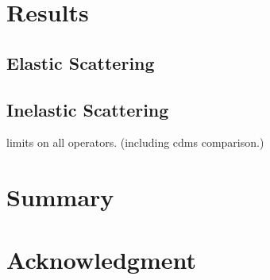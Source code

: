 \section{Results}
\subsection{Elastic Scattering}
\subsection{Inelastic Scattering}
limits on all operators. (including cdms comparison.)

\section{Summary}
\section{Acknowledgment}

